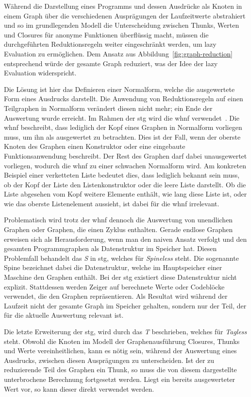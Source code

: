 Während die Darstellung eines Programms und dessen Ausdrücke als Knoten in einem Graph über die verschiedenen Ausprägungen der Laufzeitwerte abstrahiert und so im grundlegenden Modell die Unterscheidung zwischen Thunks, Werten und Closures für anonyme Funktionen überflüssig macht, müssen die durchgeführten Reduktionsregeln weiter eingeschränkt werden, um lazy Evaluation zu ermöglichen.
Dem Ansatz aus Abbildung~\ref{fig:graph-reduction} entsprechend würde der gesamte Graph reduziert, was der Idee der lazy Evaluation widerspricht.

Die Lösung ist hier das Definieren einer Normalform, welche die ausgewertete Form eines Ausdrucks darstellt.
Die Anwendung von Reduktionsregeln auf einen Teilgraphen in Normalform verändert diesen nicht mehr; ein Ende der Auswertung wurde erreicht.
Im Rahmen der \gls{stg} wird die \gls{whnf} verwendet~\cite{Wiki_Haskell}.
Die \gls{whnf} beschreibt, dass lediglich der Kopf eines Graphen in Normalform vorliegen muss, um ihn als ausgewertet zu betrachten.
Dies ist der Fall, wenn der oberste Knoten des Graphen einen Konstruktor oder eine eingebaute Funktionsanwendung beschreibt.
Der Rest des Graphen darf dabei unausgewertet vorliegen, wodurch die \gls{whnf} zu einer schwachen Normalform wird.
Am konkreten Beispiel einer verketteten Liste bedeutet dies, dass lediglich bekannt sein muss, ob der Kopf der Liste den Listenkonstruktor oder die leere Liste darstellt.
Ob die Liste abgesehen vom Kopf weitere Elemente enthält, wie lang diese Liste ist, oder wie das oberste Listenelement aussieht, ist dabei für die \gls{whnf} irrelevant.

Problematisch wird trotz der \gls{whnf} dennoch die Auswertung von unendlichen Graphen oder Graphen, die einen Zyklus enthalten.
Gerade endlose Graphen erweisen sich als Herausforderung, wenn man den naiven Ansatz verfolgt und den gesamten Programmgraphen als Datenstruktur im Speicher hat.
Diesen Problemfall behandelt das \textit{S} in \gls{stg}, welches für \textit{Spineless} steht.
Die sogenannte Spine bezeichnet dabei die Datenstruktur, welche im Hauptspeicher einer Maschine den Graphen enthält.
Bei der \gls{stg} existiert diese Datenstruktur nicht explizit.
Stattdessen werden Zeiger auf berechnete Werte oder Codeblöcke verwendet, die den Graphen repräsentieren.
Als Resultat wird während der Laufzeit nicht der gesamte Graph im Speicher gehalten, sondern nur der Teil, der für die aktuelle Auswertung relevant ist.

Die letzte Erweiterung der \gls{stg}, wird durch das \textit{T} beschrieben, welches für \textit{Tagless} steht.
Obwohl die Knoten im Modell der Graphenausführung Closures, Thunks und Werte vereinheitlichen, kann es nötig sein, während der Auswertung eines Ausdrucks, zwischen diesen Ausprägungen zu unterscheiden.
Ist der zu reduzierende Teil des Graphen ein Thunk, so muss die von diesem dargestellte unterbrochene Berechnung fortgesetzt werden.
Liegt ein bereits ausgewerteter Wert vor, so kann dieser direkt verwendet werden.

